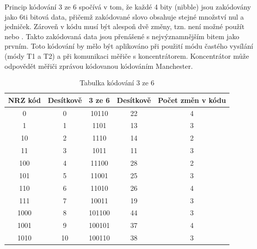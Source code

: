 Princip kódování 3 ze 6 spočívá v tom, že každé 4 bity (nibble) jsou zakódovány jako 6ti bitová data, přičemž zakódované slovo obsahuje stejné množství nul a jedniček. Zároveň v kódu musí být alespoň dvě změny, tzn. není možné použít  nebo . Takto zakódovaná data jsou přenášené s nejvýznamnějším bitem jako prvním. Toto kódování by mělo být aplikováno při použití módu častého vysílání (módy T1 a T2) a při komunikaci měřiče s koncentrátorem. Koncentrátor může odpovědět měřiči zprávou kódovanou kódováním Manchester.


\begin{table}[!ht]
\centering
\caption{Tabulka kódování 3 ze 6 \cite{WMencodeing}}
\begin{tabular}{|c|c|c|c|c|}
\hline
\textbf{NRZ kód} & \textbf{Desítkově} & \textbf{3 ze 6} & \textbf{Desítkově} & \textbf{Počet změn v kódu} \\ \hline
0                & 0                  & 10110               & 22                 & 4                          \\ \hline
1                & 1                  & 1101                & 13                 & 3                          \\ \hline
10               & 2                  & 1110                & 14                 & 2                          \\ \hline
11               & 3                  & 1011                & 11                 & 3                          \\ \hline
100              & 4                  & 11100               & 28                 & 2                          \\ \hline
101              & 5                  & 11001               & 25                 & 3                          \\ \hline
110              & 6                  & 11010               & 26                 & 4                          \\ \hline
111              & 7                  & 10011               & 19                 & 3                          \\ \hline
1000             & 8                  & 101100              & 44                 & 3                          \\ \hline
1001             & 9                  & 100101              & 37                 & 4                          \\ \hline
1010             & 10                 & 100110              & 38                 & 3                          \\ \hline

\end{tabular}
\end{table}
